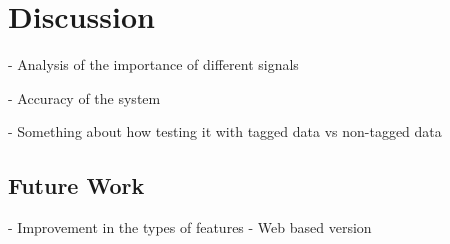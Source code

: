 \chapter{Discussion}
- Analysis of the importance of different signals

- Accuracy of the system 

- Something about how testing it with tagged data vs non-tagged data

\section{Future Work}

- Improvement in the types of features
- Web based version
